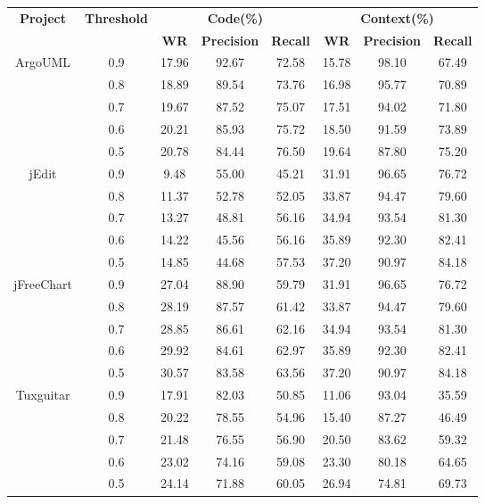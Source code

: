 \begin{table}[htbp]
\vspace{0.5em}\centering\wuhao
\begin{tabular}{cccccccc}
\toprule[1.5pt]
\multirow{2}{*}{\textbf{Project}}&\multirow{2}{*}{\textbf{Threshold}}&\multicolumn{3}{c}{\textbf{ Code(\%)}}&\multicolumn{3}{c}{\textbf{ Context(\%)}}\\
&&\textbf{WR}&\textbf{Precision}&\textbf{Recall}&\textbf{WR}&\textbf{Precision}&\textbf{Recall}\\
\midrule[1pt]
\multirow{5}{*}{ArgoUML}
&0.9&	17.96&	92.67&	72.58&	15.78&	98.10&	67.49\\
&0.8&	18.89&	89.54&	73.76&	16.98&	95.77&	70.89\\
&0.7&	19.67&	87.52&	75.07&	17.51&	94.02&	71.80\\
&0.6&	20.21&	85.93&	75.72&	18.50&	91.59&	73.89\\
&0.5&	20.78&	84.44&	76.50&	19.64&	87.80&	75.20\\

\multirow{5}{*}{jEdit}
&0.9&	9.48&	55.00&	45.21&	31.91&	96.65&	76.72\\
&0.8&	11.37&	52.78&	52.05&	33.87&	94.47&	79.60\\
&0.7&	13.27&	48.81&	56.16&	34.94&	93.54&	81.30\\
&0.6&	14.22&	45.56&	56.16&	35.89&	92.30&	82.41\\
&0.5&	14.85&	44.68&	57.53&	37.20&	90.97&	84.18\\

\multirow{5}{*}{jFreeChart}
&0.9&	27.04&	88.90&	59.79&	31.91&	96.65&	76.72\\
&0.8&	28.19&	87.57&	61.42&	33.87&	94.47&	79.60\\
&0.7&	28.85&	86.61&	62.16&	34.94&	93.54&	81.30\\
&0.6&	29.92&	84.61&	62.97&	35.89&	92.30&	82.41\\
&0.5&	30.57&	83.58&	63.56&	37.20&	90.97&	84.18\\

\multirow{5}{*}{Tuxguitar}
&0.9&	17.91&	82.03&	50.85&	11.06&	93.04&	35.59\\
&0.8&	20.22&	78.55&	54.96&	15.40&	87.27&	46.49\\
&0.7&	21.48&	76.55&	56.90&	20.50&	83.62&	59.32\\
&0.6&	23.02&	74.16&	59.08&	23.30&	80.18&	64.65\\
&0.5&	24.14&	71.88&	60.05&	26.94&	74.81&	69.73\\

\bottomrule[1.5pt]
\end{tabular}
\end{table}

